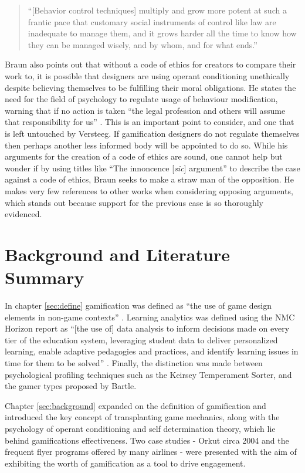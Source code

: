 \documentclass[12pt,a4paper,twoside]{report}
\begin{document}
\begin{quote}
	``[Behavior control techniques]
	multiply and grow more potent at such a frantic pace that customary
	social instruments of control like law are inadequate to
	manage them, and it grows harder all the time to know how
	they can be managed wisely, and by whom, and for what ends.''\cite{london1969behavioral}
\end{quote}

Braun also points out that without a code of ethics for creators to compare their work to, it is possible that designers are using operant conditioning unethically despite believing themselves to be fulfilling their moral obligations. He states the need for the field of psychology to regulate usage of behaviour modification, warning that if no action is taken ``the legal profession and others will assume that responsibility for us'' \cite{braun1975ethical}. This is an important point to consider, and one that is left untouched by Versteeg. If gamification designers do not regulate themselves then perhaps another less informed body will be appointed to do so. While his arguments for the creation of a code of ethics are sound, one cannot help but wonder if by using titles like ``The innoncence [\textit{sic}] argument'' to describe the case against a code of ethics, Braun seeks to make a straw man of the opposition. He makes very few references to other works when considering opposing arguments, which stands out because support for the previous case is so thoroughly evidenced.

\chapter{Background and Literature Summary}
In chapter \ref{sec:define} gamification was defined as ``the use of game design elements in non-game contexts'' \cite{deterding2011game}. Learning analytics was defined using the NMC Horizon report\cite{johnson2014nmc} as ``[the use of] data analysis to inform decisions made on every tier of the education system, leveraging student data to deliver personalized learning, enable adaptive pedagogies and practices, and identify learning issues in time for them to be solved'' \cite{johnson2014nmc}. Finally, the distinction was made between psychological profiling techniques such as the Keirsey Temperament Sorter, and the gamer types proposed by Bartle.

Chapter \ref{sec:background} expanded on the definition of gamification and introduced the key concept of transplanting game mechanics, along with the psychology of operant conditioning and self determination theory, which lie behind gamifications effectiveness. Two case studies - Orkut circa 2004 and the frequent flyer programs offered by many airlines - were presented with the aim of exhibiting the worth of gamification as a tool to drive engagement.
\end{document}
